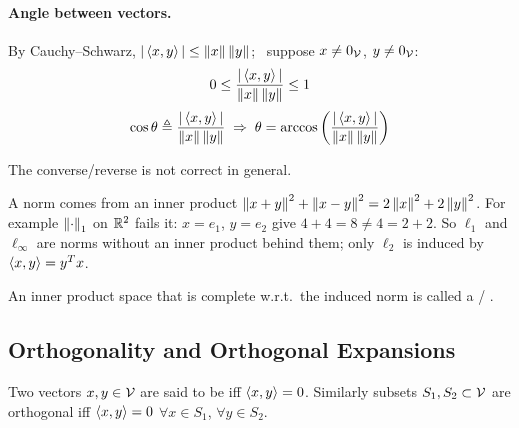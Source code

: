 \paragraph{Angle between vectors.} By Cauchy--Schwarz, $|\left\langle x, y \right\rangle| \le \left\lVert x \right\rVert\left\lVert y \right\rVert$; \ suppose $x\neq 0_{\mathcal{V}}$, $y\neq 0_{\mathcal{V}}$:
\[
0 \le \frac{|\left\langle x, y \right\rangle|}{\left\lVert x \right\rVert\left\lVert y \right\rVert} \le 1
\]
\[
\cos\theta \triangleq \frac{|\left\langle x, y \right\rangle|}{\left\lVert x \right\rVert\left\lVert y \right\rVert} \;\Rightarrow\; \theta = \arccos\left(\frac{|\left\langle x, y \right\rangle|}{\left\lVert x \right\rVert\left\lVert y \right\rVert}\right)
\]
\begin{remark}
 The converse/reverse is not correct in general.
\end{remark}
\begin{insight}
A norm comes from an inner product 
$\left\lVert x+y \right\rVert^2 + \left\lVert x-y \right\rVert^2 = 2\left\lVert x \right\rVert^2 + 2\left\lVert y \right\rVert^2$.
For example $\left\lVert \cdot \right\rVert_1$ on $\mathbb{R}^2$ fails it: $x = e_1$, $y = e_2$ give $4+4 = 8 \neq 4 = 2+2$. So $\ell_1$ and $\ell_\infty$ are norms without an inner product behind them; only $\ell_2$ is induced by $\left\langle x, y \right\rangle = y^{T} x$.
\end{insight}
\begin{definition}
An inner product space that is complete w.r.t.\ the induced norm is called a  / .
\end{definition}
\subsection{Orthogonality and Orthogonal Expansions}\label{ss:orthogonality}
\begin{definition}
Two vectors $x,y\in\mathcal{V}$ are said to be  iff $\left\langle x, y \right\rangle = 0$.
Similarly subsets $S_1, S_2\subset\mathcal{V}$ are orthogonal iff $\left\langle x, y \right\rangle = 0$ $\forall x\in S_1$, $\forall y\in S_2$.
\end{definition}
